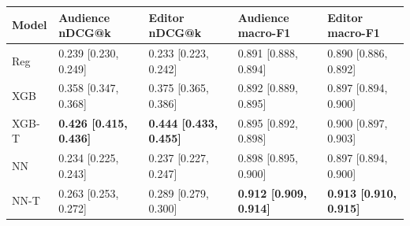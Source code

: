 \begin{tabular}{lllll}
\toprule
Model & Audience nDCG@k & Editor nDCG@k & Audience macro-F1 & Editor macro-F1 \\
\midrule
Reg & 0.239 [0.230, 0.249] & 0.233 [0.223, 0.242] & 0.891 [0.888, 0.894] & 0.890 [0.886, 0.892] \\
XGB & 0.358 [0.347, 0.368] & 0.375 [0.365, 0.386] & 0.892 [0.889, 0.895] & 0.897 [0.894, 0.900] \\
XGB-T & \textbf{0.426 [0.415, 0.436]} & \textbf{0.444 [0.433, 0.455]} & 0.895 [0.892, 0.898] & 0.900 [0.897, 0.903] \\
NN & 0.234 [0.225, 0.243] & 0.237 [0.227, 0.247] & 0.898 [0.895, 0.900] & 0.897 [0.894, 0.900] \\
NN-T & 0.263 [0.253, 0.272] & 0.289 [0.279, 0.300] & \textbf{0.912 [0.909, 0.914]} & \textbf{0.913 [0.910, 0.915]} \\
\bottomrule
\end{tabular}
